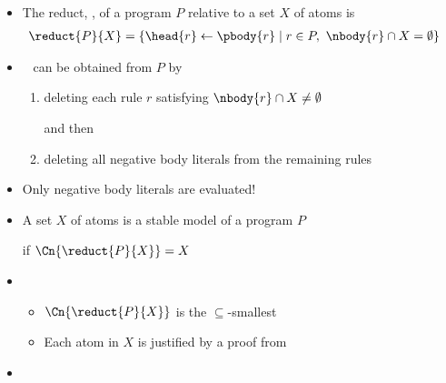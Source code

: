 \begin{frame}{}

  \begin{itemize}
  \item <2-13> The \alert{reduct}, , of a program $P$ relative to
    a set $X$ of atoms is
    \begin{align*}
      \reduct{P}{X} &= \{\head{r}\leftarrow\pbody{r} \mid r\in P,\ \nbody{r}\cap X=\emptyset\}
    \end{align*}

  \item<only@3-4>  \  can be obtained from $P$ by
    \begin{enumerate}\normalsize
    \item deleting each rule $r$ satisfying $\nbody{r}\cap X\neq\emptyset$

      and then

    \item deleting all negative body literals from the remaining rules
    \end{enumerate}
  \item<only@4>[] Only negative body literals are evaluated!

  \item <only@7-13> A set $X$ of atoms is a \alert{stable model} of a program $P$

    if $\Cn{\reduct{P}{X}}=X$

    \smallskip

  \item<only@9-10> 
    \begin{itemize}\normalsize
    \item $\Cn{\reduct{P}{X}}$ is the $\subseteq$-smallest  
      \smallskip
    \item Each atom in $X$ is justified by a proof from 
    \end{itemize}

  \item<only@11-12> 


\end{itemize}
\end{frame}
